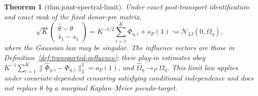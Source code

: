 \documentclass{article}
\newtheorem{theorem}{Theorem}
\begin{document}
\begin{theorem}[thm:joint-spectral-limit]\label{thm:joint-spectral-limit}
Under exact post-transport identification and exact rank of the fixed donor-pre matrix,
\[
 \sqrt K\begin{pmatrix}\widehat\theta-\theta\\ \widehat s_1-s_1\end{pmatrix}
 =K^{-1/2}\sum_{i=1}^K\Phi_{\eta,i}+o_P(1)
 \rightsquigarrow\mathcal N_{2J}(0,\Omega_\eta),
\]
where the Gaussian law may be singular. The influence vectors are those in Definition~\ref{def:transported-influence}; their plug-in estimates obey
\(K^{-1}\sum_{i=1}^K\|\widehat\Phi_{\eta,i}-\Phi_{\eta,i}\|_2^2=o_P(1)\), and \(\widehat\Omega_\eta\to_P\Omega_\eta\). This limit law applies under covariate-dependent censoring satisfying conditional independence and does not replace \(\theta\) by a marginal Kaplan--Meier pseudo-target.
\end{theorem}
\end{document}
